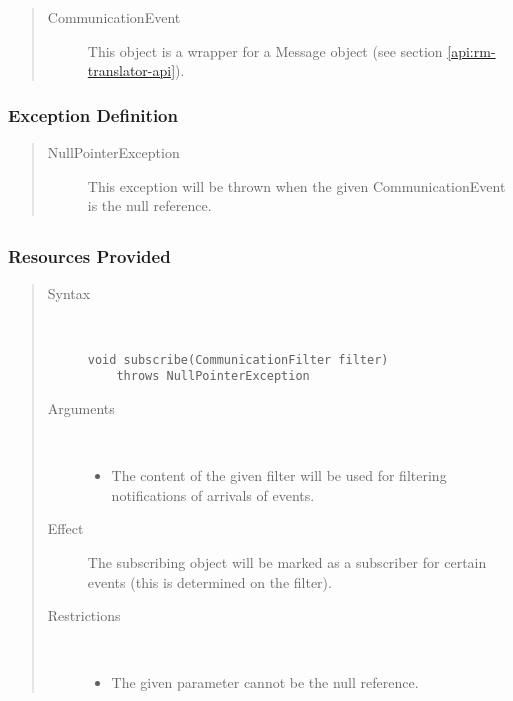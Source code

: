 \begin{quote}
	\begin{description}
		\item[CommunicationEvent] This object is a wrapper for a Message object (see
		section \ref{api:rm-translator-api}).
	\end{description} 
\end{quote}

\subsubsection{Exception Definition} 

\begin{quote}
	\begin{description}
		\item[NullPointerException] This exception will be thrown when the given
		CommunicationEvent is the null reference.
	\end{description} 
\end{quote}

\subsection{}

\subsubsection{Resources Provided}

\begin{quote}
	\begin{description}
		\item[Syntax] \
		\begin{verbatim}
void subscribe(CommunicationFilter filter)
    throws NullPointerException
		\end{verbatim}
		\item[Arguments] \
		\begin{itemize}
		  \item The content of the given filter will be used for filtering
		  notifications of arrivals of events.
		\end{itemize}
		\item[Effect] The subscribing object will be marked as a subscriber for
		certain events (this is determined on the filter).
		\item[Restrictions] \
		\begin{itemize}
		  \item The given parameter cannot be the null reference.
		\end{itemize}
	\end{description} 
\end{quote}

